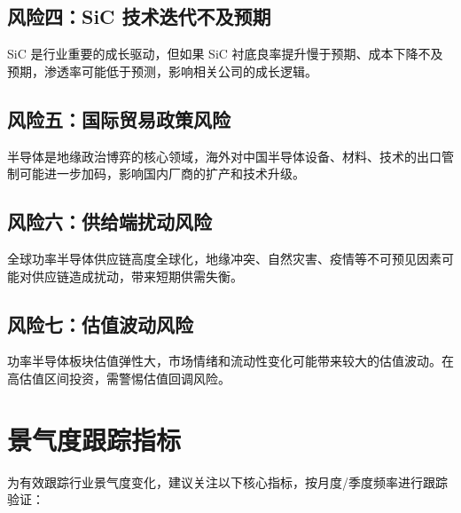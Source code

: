\subsection{风险四：SiC 技术迭代不及预期}

SiC 是行业重要的成长驱动，但如果 SiC 衬底良率提升慢于预期、成本下降不及预期，渗透率可能低于预测，影响相关公司的成长逻辑。

\subsection{风险五：国际贸易政策风险}

半导体是地缘政治博弈的核心领域，海外对中国半导体设备、材料、技术的出口管制可能进一步加码，影响国内厂商的扩产和技术升级。

\subsection{风险六：供给端扰动风险}

全球功率半导体供应链高度全球化，地缘冲突、自然灾害、疫情等不可预见因素可能对供应链造成扰动，带来短期供需失衡。

\subsection{风险七：估值波动风险}

功率半导体板块估值弹性大，市场情绪和流动性变化可能带来较大的估值波动。在高估值区间投资，需警惕估值回调风险。

\section{景气度跟踪指标}

为有效跟踪行业景气度变化，建议关注以下核心指标，按月度/季度频率进行跟踪验证：

